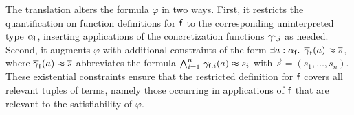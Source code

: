 
The translation alters the formula $\varphi$ in two ways. First, it restricts the
quantification on function definitions for $\mathsf{f}$ to the corresponding
uninterpreted type $\alpha_{\mathsf{f}}$, inserting applications of the concretization functions $\gamma_{\mathsf{f},i}$ as needed. 
Second, it augments $\varphi$ with additional constraints of the form
$\exists a :\nobreak \alpha_{\mathsf{f}}.\;\, \overline{\gamma}_{\mathsf{f}}( a ) \approx \overline{s}$,
where $\overline{\gamma}_{\mathsf{f}}( a ) \approx \overline{s}$ abbreviates the formula
$\bigwedge_{i=1}^n\, \gamma_{\mathsf{f},i}(a) \approx s_i$
with $\vec s = (s_1,\ldots,s_n)$.
These existential %
constraints
ensure that the restricted definition for $\mathsf{f}$ covers all relevant tuples
of terms, namely those occurring in applications of $\mathsf{f}$ 
that are relevant to the satisfiability of $\varphi$.

